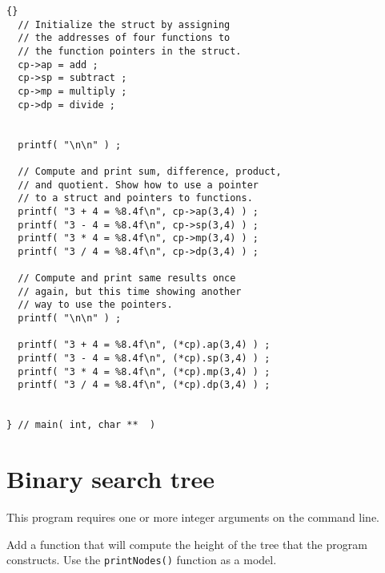 \documentclass[twosides]{article}
\begin{document}
\begin{lstlisting}{}
  // Initialize the struct by assigning
  // the addresses of four functions to
  // the function pointers in the struct.
  cp->ap = add ;
  cp->sp = subtract ;
  cp->mp = multiply ;
  cp->dp = divide ;


  printf( "\n\n" ) ;

  // Compute and print sum, difference, product,
  // and quotient. Show how to use a pointer
  // to a struct and pointers to functions.
  printf( "3 + 4 = %8.4f\n", cp->ap(3,4) ) ;
  printf( "3 - 4 = %8.4f\n", cp->sp(3,4) ) ;
  printf( "3 * 4 = %8.4f\n", cp->mp(3,4) ) ;
  printf( "3 / 4 = %8.4f\n", cp->dp(3,4) ) ;

  // Compute and print same results once
  // again, but this time showing another
  // way to use the pointers.
  printf( "\n\n" ) ;

  printf( "3 + 4 = %8.4f\n", (*cp).ap(3,4) ) ;
  printf( "3 - 4 = %8.4f\n", (*cp).sp(3,4) ) ;
  printf( "3 * 4 = %8.4f\n", (*cp).mp(3,4) ) ;
  printf( "3 / 4 = %8.4f\n", (*cp).dp(3,4) ) ;


} // main( int, char **  )
  \end{lstlisting}

\section{Binary search tree}

This program requires one or more integer
arguments on the command line.

Add a function that will compute the height
of the tree that the program constructs.
Use the \lstinline+printNodes()+ function as
a model.
\end{document}
